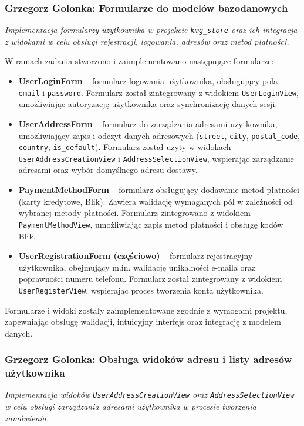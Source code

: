 \documentclass[12pt,a4paper,oneside]{article}
\theoremstyle{definition}
\numberwithin{equation}{section}
\begin{document}
\subsubsection{Grzegorz Golonka: Formularze do modelów bazodanowych}
\label{section:1.3.23}
\textit{
Implementacja formularzy użytkownika w projekcie \texttt{kmg\_store} oraz ich integracja z widokami w celu obsługi rejestracji, logowania, adresów oraz metod płatności.
}

W ramach zadania stworzono i zaimplementowano następujące formularze:
\begin{itemize}
    \item \textbf{UserLoginForm} – formularz logowania użytkownika, obsługujący pola \texttt{email} i \texttt{password}. Formularz został zintegrowany z widokiem \texttt{UserLoginView}, umożliwiając autoryzację użytkownika oraz synchronizację danych sesji.
    \item \textbf{UserAddressForm} – formularz do zarządzania adresami użytkownika, umożliwiający zapis i odczyt danych adresowych (\texttt{street}, \texttt{city}, \texttt{postal\_code}, \texttt{country}, \texttt{is\_default}). Formularz został użyty w widokach \texttt{UserAddressCreationView} i \texttt{AddressSelectionView}, wspierając zarządzanie adresami oraz wybór domyślnego adresu dostawy.
    \item \textbf{PaymentMethodForm} – formularz obsługujący dodawanie metod płatności (karty kredytowe, Blik). Zawiera walidację wymaganych pól w zależności od wybranej metody płatności. Formularz zintegrowano z widokiem \texttt{PaymentMethodView}, umożliwiając zapis metod płatności i obsługę kodów Blik.
    \item \textbf{UserRegistrationForm (częściowo)} – formularz rejestracyjny użytkownika, obejmujący m.in. walidację unikalności e-maila oraz poprawności numeru telefonu. Formularz został zintegrowany z widokiem \texttt{UserRegisterView}, wspierając proces tworzenia konta użytkownika.
\end{itemize}

Formularze i widoki zostały zaimplementowane zgodnie z wymogami projektu, zapewniając obsługę walidacji, intuicyjny interfejs oraz integrację z modelem danych.
%
%
\subsubsection{Grzegorz Golonka: Obsługa widoków adresu i listy adresów użytkownika}
\label{section:1.3.24}
\textit{
Implementacja widoków \texttt{UserAddressCreationView} oraz \texttt{AddressSelectionView} w celu obsługi zarządzania adresami użytkownika w procesie tworzenia zamówienia.
}
\end{document}
